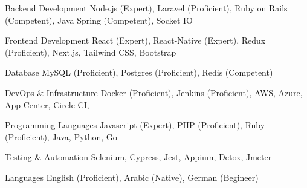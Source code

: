 

\begin{cvskills}


  \cvskill
    {Backend Development} %
    {
        Node.js (Expert),
        Laravel (Proficient),
        Ruby on Rails (Competent),
        Java Spring (Competent),
        Socket IO
    } %

  \cvskill
    {Frontend Development} %
    {React (Expert), React-Native (Expert), Redux (Proficient), Next.js, Tailwind CSS, Bootstrap} %

  \cvskill
    {Database} %
    {MySQL (Proficient), Postgres (Proficient), Redis (Competent) } %

  \cvskill
    {DevOps \& Infrastructure} %
    {Docker (Proficient), Jenkins (Proficient), AWS, Azure, App Center, Circle CI,} %

  \cvskill
    {Programming Languages} %
    {Javascript (Expert), PHP (Proficient), Ruby (Proficient), Java, Python, Go} %

  \cvskill
    {Testing \& Automation} %
    {Selenium, Cypress, Jest, Appium, Detox, Jmeter} %

  \cvskill
    {Languages} %
    {English (Proficient), Arabic (Native), German (Begineer)} %

\end{cvskills}
